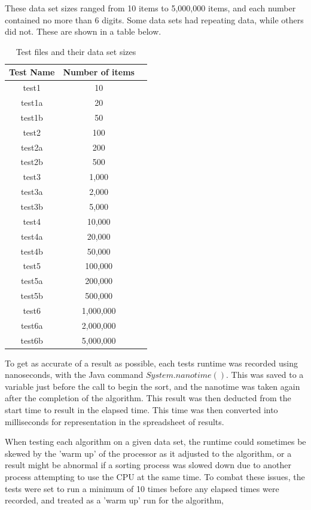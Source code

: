 \documentclass{acm_proc_article-sp}
\begin{document}
These data set sizes ranged from 10 items to 5,000,000 items, and each number contained no more than 6 digits. Some data sets had repeating data, while others did not. These are shown in a table below.

\begin{table}[h]
\centering
\caption{Test files and their data set sizes}
\begin{tabular}{|c|c|l|} \hline
Test Name&Number of items\\ \hline
test1 & 10\\ \hline
test1a & 20\\ \hline
test1b & 50\\ \hline
test2 & 100\\ \hline
test2a & 200\\ \hline
test2b & 500\\ \hline
test3 & 1,000\\ \hline
test3a & 2,000\\ \hline
test3b & 5,000\\ \hline
test4 & 10,000\\ \hline
test4a & 20,000\\ \hline
test4b & 50,000\\ \hline
test5 & 100,000\\ \hline
test5a & 200,000\\ \hline
test5b & 500,000\\ \hline
test6 & 1,000,000\\ \hline
test6a & 2,000,000\\ \hline
test6b & 5,000,000\\ 
\hline\end{tabular}
\end{table}

To get as accurate of a result as possible, each tests runtime was recorded
using nanoseconds, with the Java command \begin{math} System.nanotime() \end{math}.
This was saved to a variable just before the call to begin the sort, and the nanotime was taken again after the completion of the algorithm. This result was then deducted from the start time to result in the elapsed time.
This time was then converted into milliseconds for representation in the spreadsheet of results.

When testing each algorithm on a given data set, the runtime could sometimes be
skewed by the 'warm up' of the processor as it adjusted to the algorithm, or a
result might be abnormal if a sorting process was slowed down due to another process
attempting to use the CPU at the same time. To combat these issues, the
tests were set to run a minimum of 10 times before any elapsed times were recorded,
and treated as  a 'warm up' run for the algorithm,
\end{document}
